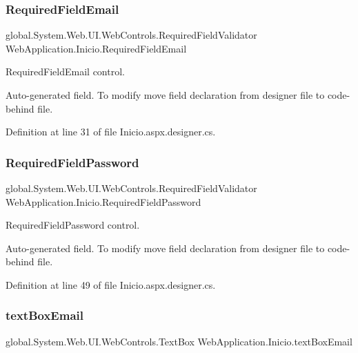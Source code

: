 \subsubsection{\texorpdfstring{RequiredFieldEmail}{RequiredFieldEmail}}
{\footnotesize\ttfamily global.\+System.\+Web.\+U\+I.\+Web\+Controls.\+Required\+Field\+Validator Web\+Application.\+Inicio.\+Required\+Field\+Email\hspace{0.3cm}{\ttfamily [protected]}}



Required\+Field\+Email control. 

Auto-\/generated field. To modify move field declaration from designer file to code-\/behind file. 

Definition at line 31 of file Inicio.\+aspx.\+designer.\+cs.

\mbox{\label{classWebApplication_1_1Inicio_a47510251f435c39f6ca1b35d7db252d7}} 
\subsubsection{\texorpdfstring{RequiredFieldPassword}{RequiredFieldPassword}}
{\footnotesize\ttfamily global.\+System.\+Web.\+U\+I.\+Web\+Controls.\+Required\+Field\+Validator Web\+Application.\+Inicio.\+Required\+Field\+Password\hspace{0.3cm}{\ttfamily [protected]}}



Required\+Field\+Password control. 

Auto-\/generated field. To modify move field declaration from designer file to code-\/behind file. 

Definition at line 49 of file Inicio.\+aspx.\+designer.\+cs.

\mbox{\label{classWebApplication_1_1Inicio_a13ef502ea57d897fdd0ae107508d8fbb}} 
\subsubsection{\texorpdfstring{textBoxEmail}{textBoxEmail}}
{\footnotesize\ttfamily global.\+System.\+Web.\+U\+I.\+Web\+Controls.\+Text\+Box Web\+Application.\+Inicio.\+text\+Box\+Email\hspace{0.3cm}{\ttfamily [protected]}}



